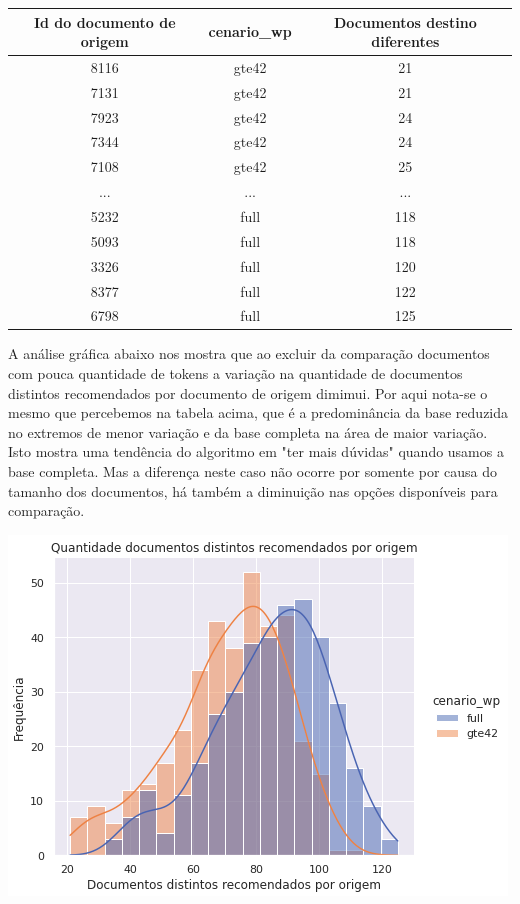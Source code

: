 \begin{center}
    \begin{tabular}{|c|c|c|}
        \hline
        Id do documento de origem & cenario\_wp & Documentos destino diferentes \\
        \hline
        8116 & gte42 & 21 \\
        \hline
        7131 & gte42 & 21 \\
        \hline
        7923 & gte42 & 24 \\
        \hline
        7344 & gte42 & 24 \\
        \hline
        7108 & gte42 & 25 \\
        \hline
        ... & ... & ... \\
        \hline
        5232 & full & 118 \\
        \hline
        5093 & full & 118 \\
        \hline
        3326 & full & 120 \\
        \hline
        8377 & full & 122 \\
        \hline
        6798 & full & 125 \\
        \hline
    \end{tabular}
\end{center}

A análise gráfica abaixo nos mostra que ao excluir da comparação documentos com pouca quantidade de tokens a variação na quantidade de documentos
distintos recomendados por documento de origem dimimui. Por aqui nota-se o mesmo que percebemos na tabela acima, que é a predominância da base reduzida
no extremos de menor variação e da base completa na área de maior variação. Isto mostra uma tendência do algoritmo em "ter mais dúvidas" quando usamos 
a base completa. Mas a diferença neste caso não ocorre por somente por causa do tamanho dos documentos, há também a diminuição nas opções disponíveis para
comparação.

\includegraphics[scale=0.7]{resultados/resources/distribuicao_semelhantes_distintos_cenario_wp.png}

